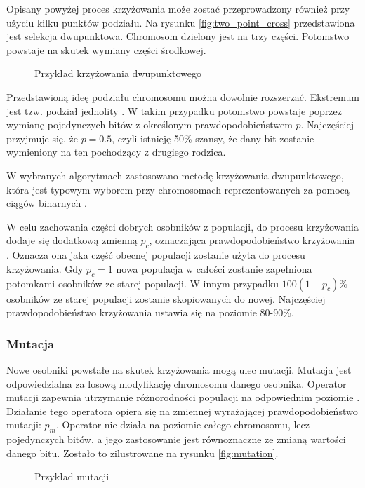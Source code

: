 \documentclass[twoside]{iisthesis}
\begin{document}
Opisany powyżej proces krzyżowania może zostać przeprowadzony również przy użyciu kilku punktów podziału. Na rysunku \eqref{fig:two_point_cross} przedstawiona jest selekcja dwupunktowa. Chromosom dzielony jest na trzy części. Potomstwo powstaje na skutek wymiany części środkowej.
\begin{figure}[!htb]
	\centering
	\caption{Przykład krzyżowania dwupunktowego}
	\label{fig:two_point_cross}
\end{figure}

Przedstawioną ideę podziału chromosomu można dowolnie rozszerzać. Ekstremum jest tzw. podział jednolity \cite{book}. W takim przypadku potomstwo powstaje poprzez wymianę pojedynczych bitów z określonym prawdopodobieństwem $p$. Najczęściej przyjmuje się, że $p = 0.5$, czyli istnieję 50\% szansy, że dany bit zostanie wymieniony na ten pochodzący z drugiego rodzica.

W wybranych algorytmach zastosowano metodę krzyżowania dwupunktowego, która jest typowym wyborem przy chromosomach reprezentowanych za pomocą ciągów binarnych \cite{sensors}.

W celu zachowania części dobrych osobników z populacji, do procesu krzyżowania dodaje się dodatkową zmienną $p_{c}$, oznaczająca prawdopodobieństwo krzyżowania \cite{ga_book}. Oznacza ona jaka część obecnej populacji zostanie użyta do procesu krzyżowania. Gdy $p_{c} = 1$ nowa populacja w całości zostanie zapełniona potomkami osobników ze starej populacji. W innym przypadku $100(1 - p_{c})\%$ osobników ze starej populacji zostanie skopiowanych do nowej. Najczęściej prawdopodobieństwo krzyżowania ustawia się na poziomie 80-90\%.

\subsubsection{Mutacja}
Nowe osobniki powstałe na skutek krzyżowania mogą ulec mutacji. Mutacja jest odpowiedzialna za losową modyfikację chromosomu danego osobnika. Operator mutacji zapewnia utrzymanie różnorodności populacji na odpowiednim poziomie \cite{ga_book}. Działanie tego operatora opiera się na zmiennej wyrażającej prawdopodobieństwo mutacji: $p_{m}$. Operator nie działa na poziomie całego chromosomu, lecz pojedynczych bitów, a jego zastosowanie jest równoznaczne ze zmianą wartości danego bitu. Zostało to zilustrowane na rysunku \eqref{fig:mutation}.
\begin{figure}[!htb]
	\centering
	\caption{Przykład mutacji}
	\label{fig:mutation}
\end{figure}
\end{document}
